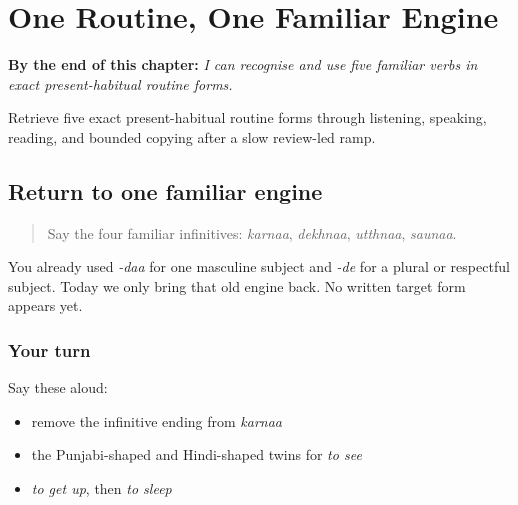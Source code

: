 
\chapter{One Routine, One Familiar Engine}
\label{ch:pa-a2-habitual-routine}

\begin{chapteropening}
\textbf{By the end of this chapter:} \emph{I can recognise and use five familiar verbs in exact present-habitual routine forms.}

Retrieve five exact present-habitual routine forms through listening, speaking, reading, and bounded copying after a slow review-led ramp.
\end{chapteropening}

\section[(habitual review)]{Return to one familiar engine}

\label{lesson:PA-C183-habitual-return}



\begin{quote}
Say the four familiar infinitives: \emph{karnaa}, \emph{dekhnaa}, \emph{utthnaa}, \emph{saunaa}.
\end{quote}

\begin{grammarlens}[title={Grammar Lens: stem plus a familiar ending}]
You already used \emph{-daa} for one masculine subject and \emph{-de} for a plural or respectful subject. Today we only bring that old engine back. No written target form appears yet.
\end{grammarlens}

\subsection*{Your turn}
Say these aloud:

\begin{itemize}
\raggedright
  \item remove the infinitive ending from \emph{karnaa}
  \item the Punjabi-shaped and Hindi-shaped twins for \emph{to see}
  \item \emph{to get up}, then \emph{to sleep}
\end{itemize}

